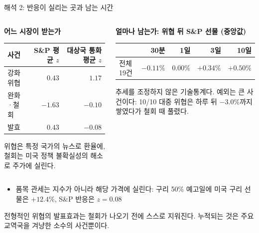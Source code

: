 \documentclass[aspectratio=169,9pt,t]{beamer}
\newcommand{\takeaway}[1]{%
  \par\vfill
  \noindent{\color{navy}\vrule width 1.6pt}\hspace{2.6mm}%
  \begin{minipage}[c]{\dimexpr\linewidth-5mm\relax}\small\linespread{1.15}\selectfont\RaggedRight #1\end{minipage}\par\vspace{1.2mm}}
\newcommand{\lab}[1]{{\small\bfseries\color{navy}#1}}
\newcommand{\tf}{\fontsize{8.2}{10.4}\selectfont}
\begin{document}
\begin{frame}{해석 2: 반응이 실리는 곳과 남는 시간}
\begin{columns}[t,onlytextwidth]
\begin{column}{0.47\textwidth}
\lab{어느 시장이 받는가}
\begingroup\tf
\begin{tabularx}{\linewidth}{@{}Yrr@{}}
\toprule
사건 & S\&P 평균 $z$ & 대상국 통화 평균 $z$\\
\midrule
강화 위협 & $0.43$ & $1.17$\\
완화·철회 & $-1.63$ & $-0.10$\\
발효 & $0.43$ & $-0.08$\\
\bottomrule
\end{tabularx}\endgroup
\vspace{1.5mm}
{\small\RaggedRight 위협은 특정 국가의 뉴스로 환율에, 철회는 미국 정책 불확실성의 해소로 주가에 실린다.\par}
\end{column}
\begin{column}{0.49\textwidth}
\lab{얼마나 남는가: 위협 뒤 S\&P 선물 (중앙값)}
\begingroup\tf
\begin{tabularx}{\linewidth}{@{}Yrrrr@{}}
\toprule
 & 30분 & 1일 & 3일 & 10일\\
\midrule
전체 19건 & $-0.11\%$ & $0.00\%$ & $+0.34\%$ & $+0.50\%$\\
\bottomrule
\end{tabularx}\endgroup
\vspace{1.5mm}
{\small\RaggedRight 추세를 조정하지 않은 기술통계다. 예외는 큰 사건이다: 10/10 대중 위협은 하루 뒤 $-3.0\%$까지 쌓였다가 철회 때 풀렸다.\par}
\end{column}
\end{columns}
\vspace{1mm}
\begin{itemize}
\item 품목 관세는 지수가 아니라 해당 가격에 실린다: 구리 50\% 예고일에 미국 구리 선물은 $+12.4\%$, S\&P 반응은 $z=0.08$
\end{itemize}
\takeaway{전형적인 위협의 발표효과는 철회가 나오기 전에 스스로 지워진다. 누적되는 것은 주요 교역국을 겨냥한 소수의 사건뿐이다.}
\end{frame}
\end{document}
